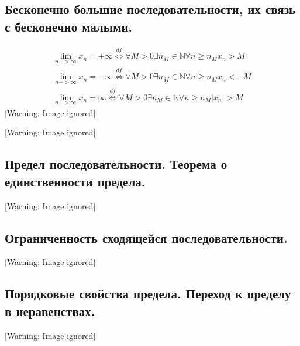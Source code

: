 \documentclass[a4paper]{article}
\begin{document}
\subsection{Бесконечно большие последовательности, их связь с бесконечно малыми.}
\begin{equation*}
\begin{gathered}\lim _{n->\infty }x_n=+\infty \overset{\mathit{df}}{\Leftrightarrow }\forall M>0\exists n_M\in
\mathbb{N}\forall n\ge n_Mx_n>M\\\lim _{n->\infty }x_n=-\infty \overset{\mathit{df}}{\Leftrightarrow }\forall
M>0\exists n_M\in \mathbb{N}\forall n\ge n_Mx_n<-M\\\lim _{n->\infty }x_n=\infty \overset{\mathit{df}}{\Leftrightarrow
}\forall M>0\exists n_M\in \mathbb{N}\forall n\ge n_M|x_n|>M\end{gathered}
\end{equation*}
  [Warning: Image ignored] %
 

  [Warning: Image ignored] %
 

\subsection{Предел последовательности. Теорема о единственности предела.}
  [Warning: Image ignored] %
 

\subsection{Ограниченность сходящейся последовательности.}
  [Warning: Image ignored] %
 

\subsection{Порядковые свойства предела. Переход к пределу в неравенствах.}
  [Warning: Image ignored] %
 
\end{document}

